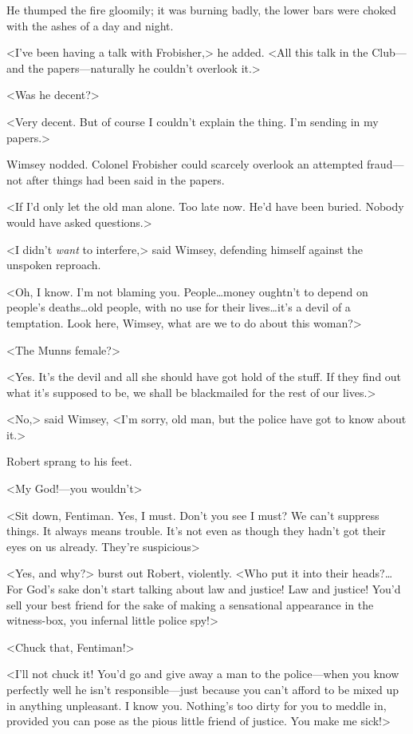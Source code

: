 He thumped the fire gloomily; it was burning badly, the lower bars were choked with the ashes of a day and night.

<I've been having a talk with Frobisher,> he added. <All this talk in the Club—and the papers—naturally he couldn't overlook it.>

<Was he decent?>

<Very decent. But of course I couldn't explain the thing. I'm sending in my papers.>

Wimsey nodded. Colonel Frobisher could scarcely overlook an attempted fraud—not after things had been said in the papers.

<If I'd only let the old man alone. Too late now. He'd have been buried. Nobody would have asked questions.>

<I didn't \emph{want} to interfere,> said Wimsey, defending himself against the unspoken reproach.

<Oh, I know. I'm not blaming you. People\dots  money oughtn't to depend on people's deaths\dots  old people, with no use for their lives\dots  it's a devil of a temptation. Look here, Wimsey, what are we to do about this woman?>

<The Munns female?>

<Yes. It's the devil and all she should have got hold of the stuff. If they find out what it's supposed to be, we shall be blackmailed for the rest of our lives.>

<No,> said Wimsey, <I'm sorry, old man, but the police have got to know about it.>

Robert sprang to his feet.

<My God!—you wouldn't\longdash>

<Sit down, Fentiman. Yes, I must. Don't you see I must? We can't suppress things. It always means trouble. It's not even as though they hadn't got their eyes on us already. They're suspicious\longdash>

<Yes, and why?> burst out Robert, violently. <Who put it into their heads?\dots For God's sake don't start talking about law and justice! Law and justice! You'd sell your best friend for the sake of making a sensational appearance in the witness-box, you infernal little police spy!>

<Chuck that, Fentiman!>

<I'll not chuck it! You'd go and give away a man to the police—when you know perfectly well he isn't responsible—just because you can't afford to be mixed up in anything unpleasant. I know you. Nothing's too dirty for you to meddle in, provided you can pose as the pious little friend of justice. You make me sick!>

